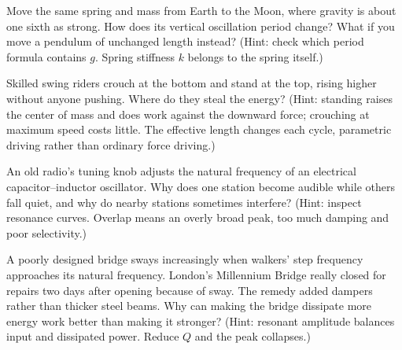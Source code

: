 \begin{puzzles}
\item Move the same spring and mass from Earth to the Moon, where gravity is about one sixth as strong. How does its vertical oscillation period change? What if you move a pendulum of unchanged length instead? (Hint: check which period formula contains \(g\). Spring stiffness \(k\) belongs to the spring itself.)
\item Skilled swing riders crouch at the bottom and stand at the top, rising higher without anyone pushing. Where do they steal the energy? (Hint: standing raises the center of mass and does work against the downward force; crouching at maximum speed costs little. The effective length changes each cycle, parametric driving rather than ordinary force driving.)
\item An old radio's tuning knob adjusts the natural frequency of an electrical capacitor--inductor oscillator. Why does one station become audible while others fall quiet, and why do nearby stations sometimes interfere? (Hint: inspect resonance curves. Overlap means an overly broad peak, too much damping and poor selectivity.)
\item A poorly designed bridge sways increasingly when walkers' step frequency approaches its natural frequency. London's Millennium Bridge really closed for repairs two days after opening because of sway. The remedy added dampers rather than thicker steel beams. Why can making the bridge dissipate more energy work better than making it stronger? (Hint: resonant amplitude balances input and dissipated power. Reduce \(Q\) and the peak collapses.)
\end{puzzles}
